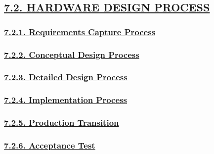 \documentclass[
]{article}
\begin{document}
\hypertarget{hardware-design-process}{%
\subsection{\texorpdfstring{\protect\hyperlink{hardware-design-process-1}{7.2.
HARDWARE DESIGN
PROCESS}}{7.2. HARDWARE DESIGN PROCESS}}\label{hardware-design-process}}

\hypertarget{requirements-capture-process}{%
\subsubsection{\texorpdfstring{\protect\hyperlink{requirements-capture-process-1}{7.2.1.
Requirements Capture
Process}}{7.2.1. Requirements Capture Process}}\label{requirements-capture-process}}

\hypertarget{conceptual-design-process}{%
\subsubsection{\texorpdfstring{\protect\hyperlink{conceptual-design-process-1}{7.2.2.
Conceptual Design
Process}}{7.2.2. Conceptual Design Process}}\label{conceptual-design-process}}

\hypertarget{detailed-design-process}{%
\subsubsection{\texorpdfstring{\protect\hyperlink{detailed-design-process-1}{7.2.3.
Detailed Design
Process}}{7.2.3. Detailed Design Process}}\label{detailed-design-process}}

\hypertarget{implementation-process}{%
\subsubsection{\texorpdfstring{\protect\hyperlink{implementation-process-1}{7.2.4.
Implementation
Process}}{7.2.4. Implementation Process}}\label{implementation-process}}

\hypertarget{production-transition}{%
\subsubsection{\texorpdfstring{\protect\hyperlink{production-transition-1}{7.2.5.
Production
Transition}}{7.2.5. Production Transition}}\label{production-transition}}

\hypertarget{acceptance-test}{%
\subsubsection{\texorpdfstring{\protect\hyperlink{acceptance-test-1}{7.2.6.
Acceptance Test}}{7.2.6. Acceptance Test}}\label{acceptance-test}}
\end{document}
